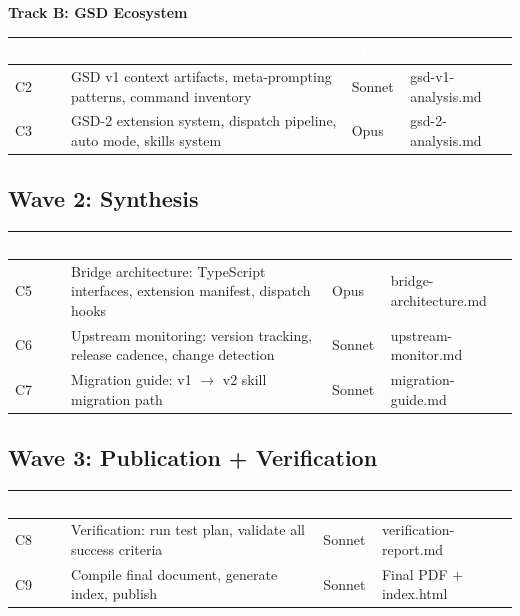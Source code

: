 \documentclass[11pt,letterpaper]{article}
\newcommand{\tableheader}[1]{\textbf{\sffamily\textcolor{white}{#1}}}
\begin{document}
\textbf{Track B: GSD Ecosystem}

\begin{center}
\begin{tabularx}{\textwidth}{C{0.8cm}L{3cm}C{1.5cm}X}
\toprule
{}
\tableheader{Comp} & \tableheader{Task} & \tableheader{Model} & \tableheader{Output} \\
\midrule
C2 & GSD v1 context artifacts, meta-prompting patterns, command inventory & Sonnet & gsd-v1-analysis.md \\
C3 & GSD-2 extension system, dispatch pipeline, auto mode, skills system & Opus & gsd-2-analysis.md \\
\bottomrule
\end{tabularx}
\end{center}

\subsection{Wave 2: Synthesis}

\begin{center}
\begin{tabularx}{\textwidth}{C{0.8cm}L{3cm}C{1.5cm}X}
\toprule
{}
\tableheader{Comp} & \tableheader{Task} & \tableheader{Model} & \tableheader{Output} \\
\midrule
C5 & Bridge architecture: TypeScript interfaces, extension manifest, dispatch hooks & Opus & bridge-architecture.md \\
C6 & Upstream monitoring: version tracking, release cadence, change detection & Sonnet & upstream-monitor.md \\
C7 & Migration guide: v1 $\rightarrow$ v2 skill migration path & Sonnet & migration-guide.md \\
\bottomrule
\end{tabularx}
\end{center}

\subsection{Wave 3: Publication + Verification}

\begin{center}
\begin{tabularx}{\textwidth}{C{0.8cm}L{3cm}C{1.5cm}X}
\toprule
{}
\tableheader{Comp} & \tableheader{Task} & \tableheader{Model} & \tableheader{Output} \\
\midrule
C8 & Verification: run test plan, validate all success criteria & Sonnet & verification-report.md \\
C9 & Compile final document, generate index, publish & Sonnet & Final PDF + index.html \\
\bottomrule
\end{tabularx}
\end{center}
\end{document}
